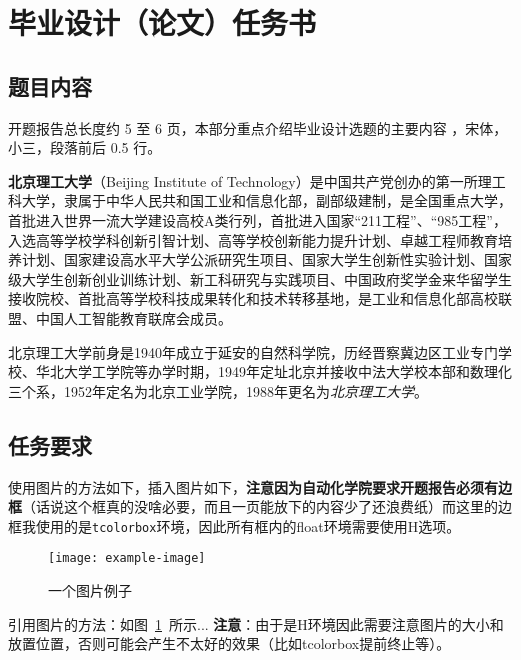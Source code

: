 \documentclass[UTF8,AutoFakeBold,AutoFakeSlant,zihao=-4]{ctexart}
\begin{document}
\section{毕业设计（论文）任务书}
\begin{ubox}

\subsection{题目内容}
开题报告总长度约 5 至 6 页，本部分重点介绍毕业设计选题的主要内容 \cite{LeCun2010}，宋体，小三，段落前后 0.5 行。

\textbf{北京理工大学}（Beijing Institute of Technology）是中国共产党创办的第一所理工科大学，隶属于中华人民共和国工业和信息化部，副部级建制，是全国重点大学，首批进入世界一流大学建设高校A类行列，首批进入国家“211工程”、“985工程”，入选高等学校学科创新引智计划、高等学校创新能力提升计划、卓越工程师教育培养计划、国家建设高水平大学公派研究生项目、国家大学生创新性实验计划、国家级大学生创新创业训练计划、新工科研究与实践项目、中国政府奖学金来华留学生接收院校、首批高等学校科技成果转化和技术转移基地，是工业和信息化部高校联盟、中国人工智能教育联席会成员。

北京理工大学前身是1940年成立于延安的自然科学院，历经晋察冀边区工业专门学校、华北大学工学院等办学时期，1949年定址北京并接收中法大学校本部和数理化三个系，1952年定名为北京工业学院，1988年更名为\emph{北京理工大学}。


\subsection{任务要求}

使用图片的方法如下，插入图片如下，\textbf{注意因为自动化学院要求开题报告必须有边框}（话说这个框真的没啥必要，而且一页能放下的内容少了还浪费纸）而这里的边框我使用的是\texttt{tcolorbox}环境，因此所有框内的float环境需要使用H选项。
\begin{figure}[H]
	\centering
	\texttt{[image: example-image]}
	\caption{一个图片例子}
	\label{fig:main}
\end{figure}

引用图片的方法：如图~\ref{fig:main}~所示... \textbf{注意}：由于是H环境因此需要注意图片的大小和放置位置，否则可能会产生不太好的效果（比如tcolorbox提前终止等）。


\end{ubox}


\newpage
\end{document}
